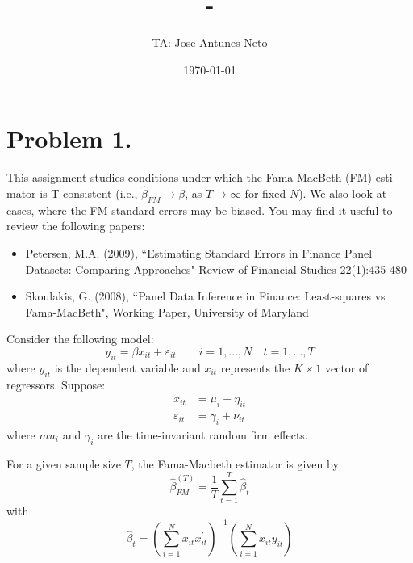 \documentclass[12pt,twoside]{article}
\title{\course-\assignment}
\author{TA: Jose Antunes-Neto}
\date{\today}
\begin{document}
\maketitle

\section{Problem 1.}
This assignment studies conditions under which the Fama-MacBeth (FM) esti-
mator is T-consistent (i.e., \(\widehat\beta_{FM} \to \beta\), as \(T \to \infty\) for fixed \(N\)). We also look at cases, where the FM standard errors may be biased. You may find it useful to review the following papers:
\begin{itemize}
    \item Petersen, M.A. (2009), ``Estimating Standard Errors in Finance Panel Datasets: Comparing Approaches" Review of Financial Studies 22(1):435-480
    \item Skoulakis, G. (2008), ``Panel Data Inference in Finance: Least-squares vs Fama-MacBeth", Working Paper, University of Maryland
\end{itemize}
Consider the following model:
\begin{equation}
    \label{eq:y_dgp}
    y_{it} = \beta x_{it} + \varepsilon_{it} \qquad i = 1, \dots, N \quad t = 1, \dots, T
\end{equation}
where \(y_{it}\) is the dependent variable and \(x_{it}\) represents the \(K\times 1\) vector of regressors. Suppose:
\begin{equation}
    \label{eq:x_dgp}
    \begin{aligned}
        x_{it} & = \mu_i + \eta_{it} \\
        \varepsilon_{it} & = \gamma_i + \nu_{it}
    \end{aligned}
\end{equation}
where \(mu_i\) and \(\gamma_i\) are the time-invariant random firm effects.

For a given sample size \(T\), the Fama-Macbeth estimator is given by
\begin{equation}
    \label{eq:fm_estimator}
    \widehat\beta^{(T)}_{FM} = \frac{1}{T} \sum_{t=1}^T  \widehat\beta_t
\end{equation}
with
\begin{equation}
    \label{eq:beta_t}
    \widehat\beta_t = \left(\sum_{i=1}^N x_{it}x_{it}^\prime\right)^{-1} \left(\sum_{i=1}^N x_{it}y_{it}\right)
\end{equation}
\end{document}

